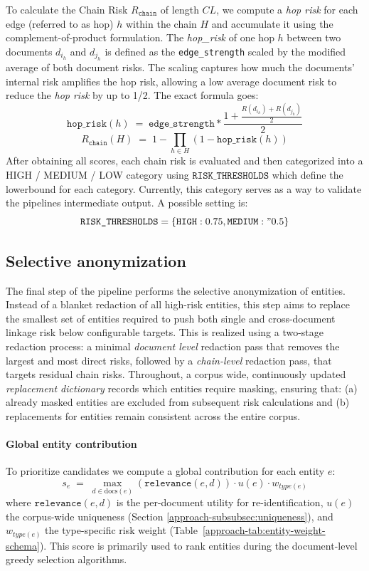 To calculate the Chain Risk $R_{\texttt{chain}}$ of length $CL$, we compute a \emph{hop risk} for each edge (referred to as hop) $h$ within the chain $H$ and accumulate it using the complement-of-product formulation. The \textit{hop\_risk} of one hop $h$ between two documents $d_{i_h}$ and $d_{j_h}$ is defined as the \texttt{edge\_strength} scaled by the modified average of both document risks. The scaling captures how much the documents' internal risk amplifies the hop risk, allowing a low average document risk to reduce the \emph{hop risk} by up to 1/2. The exact formula goes:
\[
\texttt{hop\_risk}(h)\;=\; \texttt{edge\_strength} * \frac{1+\frac{R(d_{i_h}) + R(d_{j_h})}{2}}{2}
\]
\[
R_{\texttt{chain}}(H) \;=\; 1 - \prod_{h\in H} (1 - \texttt{hop\_risk}(h))
\]
After obtaining all scores, each chain risk is evaluated and then categorized into a HIGH / MEDIUM / LOW category using $\texttt{RISK\_THRESHOLDS}$ which define the lowerbound for each category. Currently, this category serves as a way to validate the pipelines intermediate output. A possible setting is:
\[
\texttt{RISK\_THRESHOLDS} = \{\texttt{HIGH}: 0.75, \texttt{MEDIUM}:" 0.5\}
\]

\subsection{Selective anonymization}
The final step of the pipeline performs the selective anonymization of entities. Instead of a blanket redaction of all high-risk entities, this step aims to replace the smallest set of entities required to push both single and cross-document linkage risk below configurable targets. This is realized using a two-stage redaction process: a minimal \textit{document level} redaction pass that removes the largest and most direct risks, followed by a \textit{chain-level} redaction pass, that targets residual chain risks. Throughout, a corpus wide, continuously updated \textit{replacement dictionary} records which entities require masking, ensuring that: (a) already masked entities are excluded from subsequent risk calculations and (b) replacements for entities remain consistent across the entire corpus.


\paragraph{Global entity contribution} 
To prioritize candidates we compute a global contribution for each entity \(e\):
\[
s_e \;=\; \max_{d\in\mathrm{docs}(e)} (\texttt{relevance}(e,d)) \cdot u(e) \cdot w_{type(e)}
\]
where $\texttt{relevance}(e,d)$ is the per-document utility for re-identification, $u(e)$ the corpus-wide uniqueness (Section \ref{approach-subsubsec:uniqueness}), and $w_{type(e)}$ the type-specific risk weight (Table~\ref{approach-tab:entity-weight-schema}). This score is primarily used to rank entities during the document-level greedy selection algorithms.

